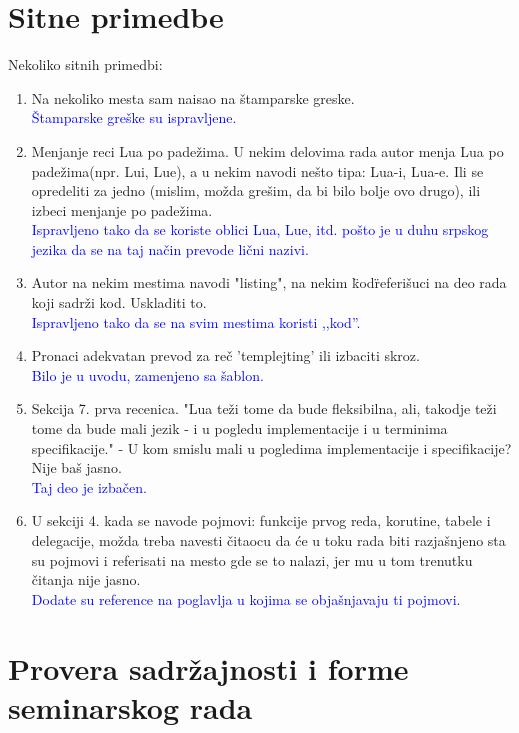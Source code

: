 \documentclass[a4paper]{report}
\newcommand{\odgovorAutora}[1]{\textcolor{blue}{#1}}
\begin{document}
\section{Sitne primedbe}
Nekoliko sitnih primedbi:
\begin{enumerate}
  \item Na nekoliko mesta sam naisao na \v stamparske greske. \\
  \odgovorAutora{Štamparske greške su ispravljene.}
  \item Menjanje reci Lua po pade\v zima. U nekim delovima rada autor menja Lua po pade\v zima(npr. Lui, Lue), a u nekim navodi ne\v sto tipa: Lua-i, Lua-e. Ili se opredeliti za jedno (mislim, mo\v zda gre\v sim, da bi bilo bolje ovo drugo), ili izbeci menjanje po pade\v zima. \\
  \odgovorAutora{Ispravljeno tako da se koriste oblici Lua, Lue, itd. pošto je u duhu srpskog jezika da se na taj način prevode lični nazivi.}
  \item Autor na nekim mestima navodi "listing", na nekim \"kod\"  referi\v suci na deo rada koji sadr\v zi kod. Uskladiti to. \\
  \odgovorAutora{Ispravljeno tako da se na svim mestima koristi ,,kod''.}
  \item Pronaci adekvatan prevod za re\v c 'templejting'  ili izbaciti skroz. \\
  \odgovorAutora{Bilo je u uvodu, zamenjeno sa šablon.}

  \item Sekcija 7. prva recenica. "Lua te\v zi tome da bude fleksibilna, ali, takodje te\v zi tome da bude mali
jezik - i u pogledu implementacije i u terminima specifikacije." - U kom smislu mali u pogledima implementacije i specifikacije? Nije ba\v s jasno. \\
  \odgovorAutora{Taj deo je izbačen.}
  \item U sekciji 4. kada se navode pojmovi: funkcije prvog reda, korutine, tabele i delegacije, mo\v zda treba navesti \v citaocu da \' ce u toku rada biti razja\v snjeno sta su pojmovi i referisati na mesto gde se to nalazi, jer mu u tom trenutku \v citanja nije jasno. \\
  \odgovorAutora{Dodate su reference na poglavlja u kojima se objašnjavaju ti pojmovi.}

\end{enumerate}


\section{Provera sadržajnosti i forme seminarskog rada}
\end{document}
